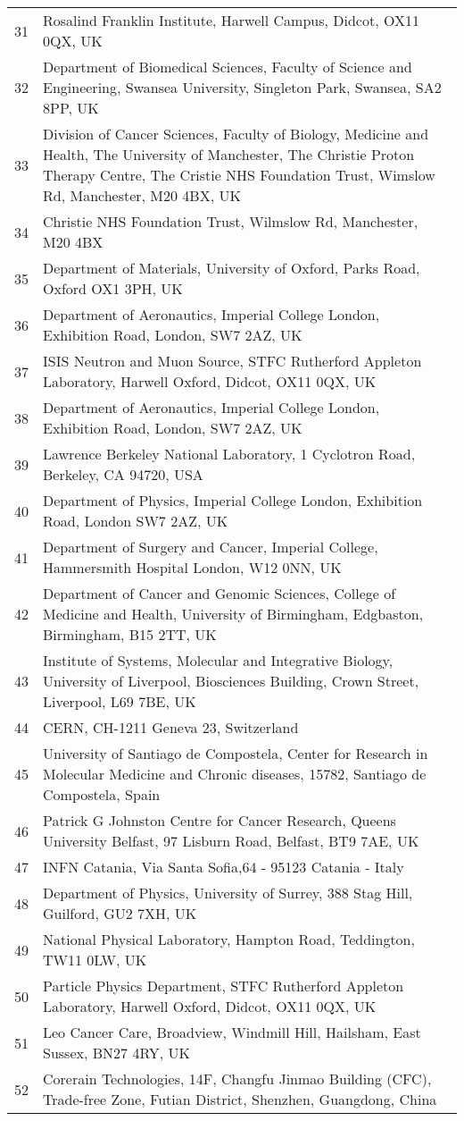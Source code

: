 {\begin{tabular}{ c p{15cm} }
     31 & Rosalind Franklin Institute, Harwell Campus, Didcot, OX11 0QX, UK\\
     32 & Department of Biomedical Sciences, Faculty of Science and Engineering, Swansea University, Singleton Park, Swansea, SA2 8PP, UK\\
     33 & Division of Cancer Sciences, Faculty of Biology, Medicine and Health, The University of Manchester, The Christie Proton Therapy Centre, The Cristie NHS Foundation Trust, Wimslow Rd, Manchester, M20 4BX, UK\\
     34 & Christie NHS Foundation Trust, Wilmslow Rd, Manchester, M20 4BX\\
     35 & Department of Materials, University of Oxford, Parks Road, Oxford OX1 3PH, UK\\
     36 & Department of Aeronautics, Imperial College London, Exhibition Road, London, SW7 2AZ, UK\\
     37 & ISIS Neutron and Muon Source, STFC Rutherford Appleton Laboratory, Harwell Oxford, Didcot, OX11 0QX, UK\\
     38 & Department of Aeronautics, Imperial College London, Exhibition Road, London, SW7 2AZ, UK\\
     39 & Lawrence Berkeley National Laboratory, 1 Cyclotron Road, Berkeley, CA 94720, USA\\
     40 & Department of Physics, Imperial College London, Exhibition Road, London SW7 2AZ, UK\\
     41 & Department of Surgery and Cancer, Imperial College, Hammersmith Hospital London, W12 0NN, UK\\
     42 & Department of Cancer and Genomic Sciences, College of Medicine and Health, University of Birmingham, Edgbaston, Birmingham, B15 2TT, UK\\
     43 & Institute of Systems, Molecular and Integrative Biology, University of Liverpool, Biosciences Building, Crown Street, Liverpool, L69 7BE, UK\\
     44 & CERN, CH-1211 Geneva 23, Switzerland\\
     45 & University of Santiago de Compostela, Center for Research in Molecular Medicine and Chronic diseases, 15782, Santiago de Compostela, Spain\\
     46 & Patrick G Johnston Centre for Cancer Research, Queens University Belfast, 97 Lisburn Road, Belfast, BT9 7AE, UK\\
     47 & INFN Catania, Via Santa Sofia,64 - 95123 Catania - Italy\\
     48 & Department of Physics, University of Surrey, 388 Stag Hill, Guilford, GU2 7XH, UK\\
     49 & National Physical Laboratory, Hampton Road, Teddington, TW11 0LW, UK\\
     50 & Particle Physics Department, STFC Rutherford Appleton Laboratory, Harwell Oxford, Didcot, OX11 0QX, UK\\
     51 & Leo Cancer Care, Broadview, Windmill Hill, Hailsham, East Sussex, BN27 4RY, UK\\
     52 & Corerain Technologies, 14F, Changfu Jinmao Building (CFC), Trade-free Zone, Futian District, Shenzhen, Guangdong, China\\
  \end{tabular}
}
